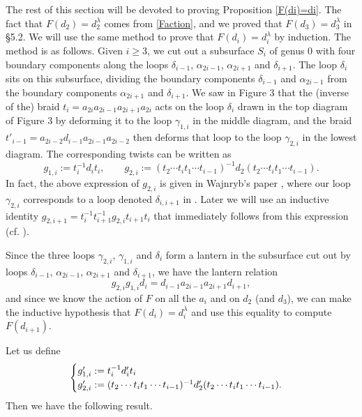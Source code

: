 \documentclass[a4paper,10pt,reqno]{amsart}
\begin{document}
The rest of this section will be devoted to proving
Proposition \ref{F(di)=di}. 
The fact that $F(d_2)=d_2^\lambda$ comes from \eqref{Faction}, and we proved that
$F(d_3)=d_3^\lambda$ in \S 5.2. 
We will use the same method to prove that $F(d_i)=d_i^\lambda$ by induction.
The method is as follows. Given $i\ge 3$,
we cut out a 
subsurface $S_i$ of genus $0$ with four boundary components along the loops $\delta_{i-1}$, $\alpha_{2i-1}$,
$\alpha_{2i+1}$ and $\delta_{i+1}$. The loop $\delta_i$ sits on this subsurface, dividing the boundary
components $\delta_{i-1}$ and $\alpha_{2i-1}$ from the boundary components $\alpha_{2i+1}$ and $\delta_{i+1}$.
We saw in Figure 3 that the (inverse of the) braid 
$t_i=a_{2i}a_{2i-1}a_{2i+1}a_{2i}$ acts on 
the loop $\delta_i$ drawn in the
top diagram of Figure 3 by deforming it to the loop 
$\gamma_{1,i}$
in the middle diagram, and the braid $t'_{i-1}
=a_{2i-2}d_{i-1}a_{2i-1}a_{2i-2}$ then deforms that loop 
to the loop $\gamma_{2,i}$ in the lowest diagram.
The corresponding twists can be written as
\begin{equation*}
g_{1,i}:=t_i^{-1}d_it_i, \qquad
g_{2,i}:=(t_2\cdots t_it_1\cdots t_{i-1} )^{-1}d_2(t_2\cdots t_it_1\cdots t_{i-1}).
\end{equation*}
In fact, the above expression of $g_{2,i}$ is given in 
Wajnryb's paper \cite[p.166 line\,$-2$]{W}, where
our loop $\gamma_{2,i}$ corresponds to
a loop denoted $\delta_{i,i+1}$ in \cite{W}.
Later we will use an inductive identity 
$g_{2,i+1}=t_{i}^{-1} t_{i+1}^{-1}g_{2,i}t_{i+1} t_{i}$
that immediately follows from this expression
(cf. \cite[p.165 (10)]{W}).

Since the three loops $\gamma_{2,i}$, $\gamma_{1,i}$ and $\delta_i$ 
form a lantern in the subsurface cut out by loops $\delta_{i-1}$,
$\alpha_{2i-1}$, $\alpha_{2i+1}$ and $\delta_{i+1}$, 
we have the lantern relation 
\begin{equation}
\label{lantern_i}
g_{2,i}g_{1,i} d_i=d_{i-1}a_{2i-1}a_{2i+1}d_{i+1},
\end{equation}
and since we know the action of $F$ on all the $a_i$ and on $d_2$ (and
$d_3$), we can make the inductive hypothesis that $F(d_i)=d_i^\lambda$ 
and use this equality to compute $F(d_{i+1})$.  

Let us define
$$\begin{cases}
g'_{1,i}:=t_i^{-1}d'_it_i\cr
g'_{2,i}:=(t_2\cdots t_it_1\cdots t_{i-1})^{-1}d'_2(t_2\cdots t_it_1\cdots t_{i-1}).
\end{cases}$$
Then we have the following result.
\end{document}
